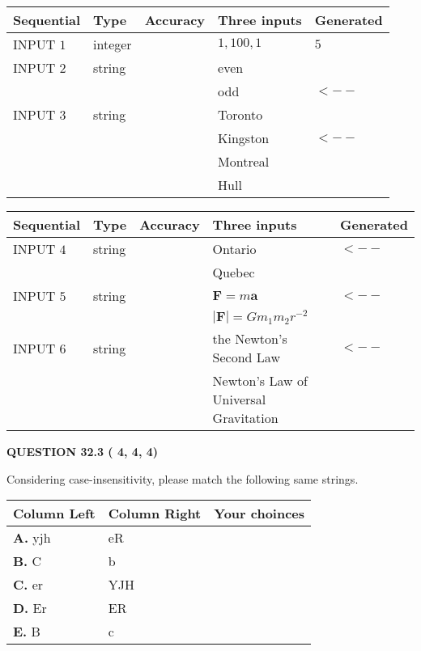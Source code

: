 \documentclass[12pt]{article}
\begin{document}
   
  
  
\noindent\begin{tabular}{|l|l|l|l|l|}
\hline
 Sequential & Type & Accuracy & Three inputs & Generated \\ 
\hline
 
 
  INPUT $           1$ & integer &  & $
 1
 , 
 100
 , 
 1
 $ & $ 5 $ 
 \\  \hline  
 
 
  INPUT $           2$ & string & & 
 even & 
  \\
  & & & 
 odd & 
  $ <-- $ 
 \\  \hline  
 
 
  INPUT $           3$ & string & & 
 Toronto & 
  \\
  & & & 
 Kingston & 
  $ <-- $ 
  \\
  & & & 
 Montreal & 
  \\
  & & & 
 Hull & 
 \\  \hline  
 \end{tabular}
   
   
  
  
\noindent\begin{tabular}{|l|l|l|l|l|}
\hline
 Sequential & Type & Accuracy & Three inputs & Generated \\ 
\hline
 
 
  INPUT $           4$ & string & & 
 Ontario & 
  $ <-- $ 
  \\
  & & & 
 Quebec & 
 \\  \hline  
 
 
  INPUT $           5$ & string & & 
 $\mathbf{F}=m\mathbf{a}$ & 
  $ <-- $ 
  \\
  & & & 
 $\left| \mathbf{F}\right| =Gm_1m_2r^{-2}$ & 
 \\  \hline  
 
 
  INPUT $           6$ & string & & 
 the Newton's Second Law & 
  $ <-- $ 
  \\
  & & & 
 Newton's Law of Universal Gravitation & 
 \\  \hline  
 \end{tabular}
   
   
  
\vspace{0.2in}
  
{\textbf{\Large{QUESTION
32.3 
 (          4,          4,          4)
}}}
  
  
Considering case-insensitivity, please match the following same strings.
  
  
\begin{tabular}{|l|l|l|}
 \hline
 Column Left & Column Right  & Your choinces \\ 
 \hline
{\textbf{\large{
A.}}}
yjh
  & 
eR
 & 
 \\ 
 \hline
{\textbf{\large{
B.}}}
C
  & 
b
 & 
 \\ 
 \hline
{\textbf{\large{
C.}}}
er
  & 
YJH
 & 
 \\ 
 \hline
{\textbf{\large{
D.}}}
Er
  & 
ER
 & 
 \\ 
 \hline
{\textbf{\large{
E.}}}
B
  & 
c
 & 
 \\ 
 \hline
 \end{tabular}
  
\end{document}
